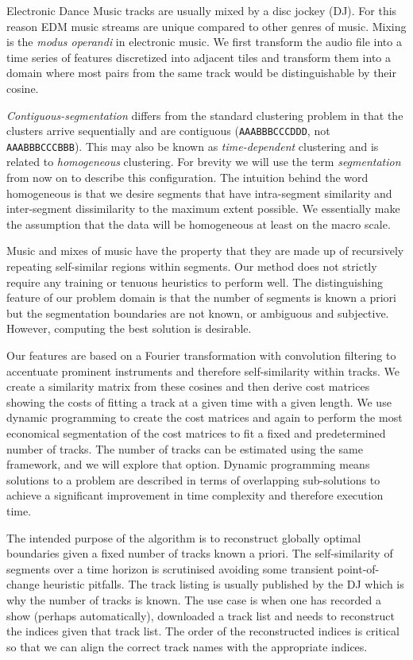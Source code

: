 \documentclass[twocolumn]{article}
\begin{document}
	Electronic Dance Music tracks are usually mixed by a disc jockey (DJ). For this reason EDM music streams are unique compared to other genres of music. Mixing is the \textit{modus operandi} in electronic music. We first transform the audio file into a time series of features discretized into adjacent tiles and transform them into a domain where most pairs from the same track would be distinguishable by their cosine. 
	
	\textit{Contiguous-segmentation} differs from the standard clustering problem in that the clusters arrive sequentially and are contiguous (\texttt{AAABBBCCCDDD}, not \texttt{AAABBBCCCBBB}). This may also be known as \textit{time-dependent} clustering and is related to \textit{homogeneous} clustering. For brevity we will use the term \textit{segmentation} from now on to describe this configuration. The intuition behind the word homogeneous is that we desire segments that have intra-segment similarity and inter-segment dissimilarity to the maximum extent possible. We essentially make the assumption that the data will be homogeneous at least on the macro scale.
	
	Music and mixes of music have the property that they are made up of recursively repeating self-similar regions within segments. Our method does not strictly require any training or tenuous heuristics to perform well. The distinguishing feature of our problem domain is that the number of segments is known a priori but the segmentation boundaries are not known, or ambiguous and subjective. However, computing the best solution is desirable.
	
	Our features are based on a Fourier transformation with convolution filtering to accentuate prominent instruments and therefore self-similarity within tracks. We create a similarity matrix from these cosines and then derive cost matrices showing the costs of fitting a track at a given time with a given length. We use dynamic programming to create the cost matrices and again to perform the most economical segmentation of the cost matrices to fit a fixed and predetermined number of tracks. The number of tracks can be estimated using the same framework, and we will explore that option. Dynamic programming means solutions to a problem are described in terms of overlapping sub-solutions to achieve a significant improvement in time complexity and therefore execution time. 
	
	The intended purpose of the algorithm is to reconstruct globally optimal boundaries given a fixed number of tracks known a priori. The self-similarity of segments over a time horizon is scrutinised avoiding some transient point-of-change heuristic pitfalls. The track listing is usually published by the DJ which is why the number of tracks is known. The use case is when one has recorded a show (perhaps automatically), downloaded a track list and needs to reconstruct the indices given that track list. The order of the reconstructed indices is critical so that we can align the correct track names with the appropriate indices. 
	
\end{document}
